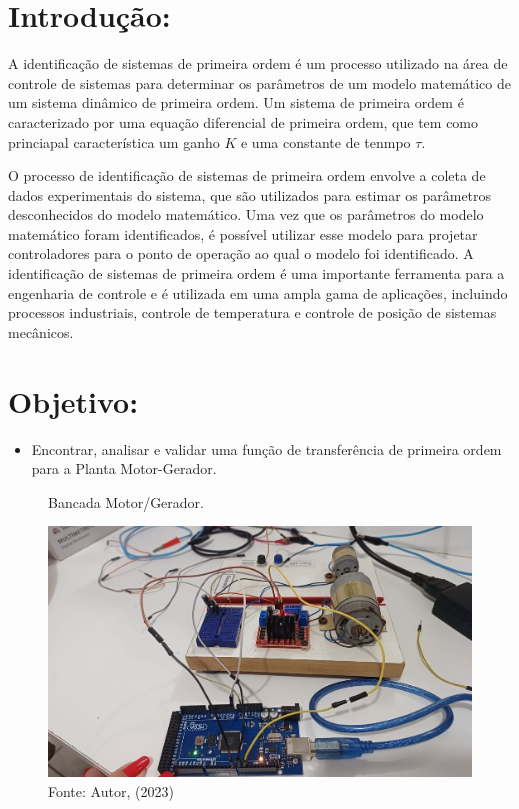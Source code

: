 \documentclass[11pt]{article}
\providecommand{\tightlist}{%
      \setlength{\itemsep}{0pt}\setlength{\parskip}{0pt}}
\begin{document}
 \vspace{0.5cm}

    \hypertarget{introduuxe7uxe3o}{%
\section{\texorpdfstring{\textbf{Introdução:}}{Introdução:}}\label{introduuxe7uxe3o}}

A identificação de sistemas de primeira ordem é um processo utilizado na
área de controle de sistemas para determinar os parâmetros de um modelo
matemático de um sistema dinâmico de primeira ordem. Um sistema de
primeira ordem é caracterizado por uma equação diferencial de primeira
ordem, que tem como princiapal característica um ganho \(K\) e uma
constante de tenmpo \(\tau\).

O processo de identificação de sistemas de primeira ordem envolve a
coleta de dados experimentais do sistema, que são utilizados para
estimar os parâmetros desconhecidos do modelo matemático. Uma vez que os
parâmetros do modelo matemático foram identificados, é possível utilizar
esse modelo para projetar controladores para o ponto de operação ao qual
o modelo foi identificado. A identificação de sistemas de primeira ordem
é uma importante ferramenta para a engenharia de controle e é utilizada
em uma ampla gama de aplicações, incluindo processos industriais,
controle de temperatura e controle de posição de sistemas mecânicos.

\newpage

\hypertarget{objetivo}{%
\section{\texorpdfstring{\textbf{Objetivo:}}{Objetivo:}}\label{objetivo}}

\begin{itemize}
\tightlist
\item
  Encontrar, analisar e validar uma função de transferência de primeira
  ordem para a Planta Motor-Gerador.
\end{itemize}

\begin{center}
	\begin{figure}[h!]
		\caption{Bancada Motor/Gerador.}
		\centering\includegraphics[width=12cm]{../../Figuras/sistema_gerador_motor.jpeg}
		\caption*{Fonte: Autor, (2023)}
	\end{figure}
\end{center}
\end{document}
